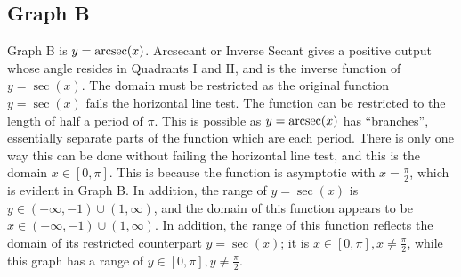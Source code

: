 \subsection{Graph B}

Graph B is $y=\operatorname{arcsec}(x)$.
Arcsecant or Inverse Secant gives a positive output whose angle resides in Quadrants I and II, and is the inverse function of $y=\sec(x)$.
The domain must be restricted as the original function $y=\sec(x)$ fails the horizontal line test.
The function can be restricted to the length of half a period of $\pi$.
This is possible as $y=\operatorname{arcsec}(x)$ has “branches”, essentially separate parts of the function which are each period.
There is only one way this can be done without failing the horizontal line test, and this is the domain $x \in{[0,\pi]}$.
This is because the function is asymptotic with $x=\frac{\pi}{2}$, which is evident in Graph B.
In addition, the range of $y=\sec(x)$ is $y \in {{({-\infty}, {-1})} \cup {(1, {\infty})}}$, and the domain of this function appears to be $x \in {{({-\infty}, {-1})} \cup {(1, {\infty})}}$.
In addition, the range of this function reflects the domain of its restricted counterpart $y=\sec(x)$; it is ${x \in {[0, \pi]}}, {x \neq \frac{\pi}{2}}$, while this graph has a range of ${y \in {[0, \pi]}}, {y \neq \frac{\pi}{2}}$.
